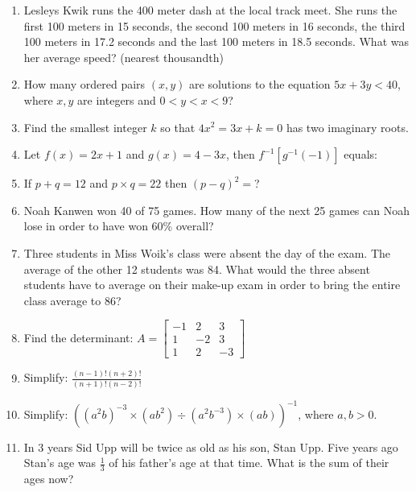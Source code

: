 \documentclass[../uilmath.tex]{subfiles}
\begin{document}
\begin{enumerate}[label=\bfseries\arabic*.]
        \item %
        Lesleys Kwik runs the 400 meter dash at the local track meet. She runs the first 100 meters in 15 seconds, the second 100 meters in 16 seconds,
        the third 100 meters in 17.2 seconds and the last 100 meters in 18.5 seconds. What was her average speed? (nearest thousandth)

        \item %
        How many ordered pairs $(x,y)$ are solutions to the equation $5x+3y<40$, where $x,y$ are integers and $0<y<x<9$?

        \item %
        Find the smallest integer $k$ so that $4x^2=3x+k=0$ has two imaginary roots.

        \item %
        Let $f(x)=2x+1$ and $g(x)=4-3x$, then $f^{-1}[g^{-1}(-1)]$ equals:

        \item %
        If $p+q=12$ and $p\times q=22$ then $(p-q)^2=$?

        \item %
        Noah Kanwen won 40 of 75 games. How many of the next 25 games can Noah lose in order to have won 60\% overall?

        \item %
        Three students in Miss Woik's class were absent the day of the exam. The average of the other 12 students was 84.
        What would the three absent students have to average on their make-up exam in order to bring the entire class average to 86?

        \item %
        Find the determinant: 
        $A = \begin{bmatrix}
            -1 & 2 & 3\\
            1 & -2 & 3\\
            1 & 2 & -3
            \end{bmatrix}$
        
        \item %
        Simplify: $\frac{(n-1)!(n+2)!}{(n+1)!(n-2)!}$

        \item %
        Simplify: $((a^2b)^{-3}\times(ab^2)\div(a^2b^{-3})\times(ab))^{-1}$, where $a,b>0$.

        \item %
        In 3 years Sid Upp will be twice as old as his son, Stan Upp. Five years ago Stan's age was $\frac{1}{3}$ of his father's age at that time. What is the sum of their ages now?


\end{enumerate}
\end{document}
